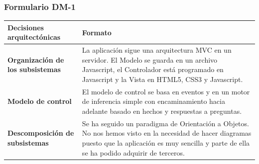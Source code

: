\documentclass[a4paper,11pt]{article}
\begin{document}
			\subsubsection{Formulario DM-1}
			\begin{center}
				\begin{tabular}{| l | p{5cm} |}
					\hline
					\cellcolor[RGB]{224,233,250}\textbf{Decisiones arquitectónicas} &
					\cellcolor[RGB]{224,233,250}\textbf{Formato} \\
					\hline
					\cellcolor[RGB]{224,233,250}\textbf{Organización de los subsistemas} & La
					aplicación sigue una arquitectura MVC en un servidor. El Modelo se guarda en un archivo Javascript, el Controlador está programado en Javascript y la Vista en HTML5, CSS3 y Javascript.
					\\
					\hline
					\cellcolor[RGB]{224,233,250}\textbf{Modelo de control} & El modelo de
					control se basa en eventos y en un motor de inferencia simple con encaminamiento hacia adelante basado en hechos y respuestas a preguntas.\\
					\hline
					\cellcolor[RGB]{224,233,250}\textbf{Descomposición de subsistemas} & Se ha
					seguido un paradigma de Orientación a Objetos. No nos hemos visto en la necesidad de hacer diagramas puesto que la aplicación es muy sencilla y parte de ella se ha podido adquirir de terceros.\\
					\hline
				\end{tabular}
			\end{center}
			\newpage
\end{document}
